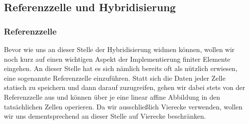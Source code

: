 \subsection{Referenzzelle und Hybridisierung}
\label{Referenzzelle&Hyb}
\subsubsection{Referenzzelle}
Bevor wie uns an dieser Stelle der Hybridisierung widmen können, wollen wir noch kurz auf einen wichtigen Aspekt der Implementierung finiter Elemente eingehen.
An dieser Stelle hat es sich nämlich bereits oft als nützlich erwiesen, eine sogenannte Referenzzelle einzuführen. Statt sich die Daten jeder Zelle statisch zu speichern und dann darauf zuzugreifen, gehen wir dabei stets von der Referenzzelle aus und können über je eine linear affine Abbildung in den tatsächlichen Zellen operieren. Da wir ausschließlich Vierecke verwenden, wollen wir uns dementsprechend an dieser Stelle auf Vierecke beschränken.


